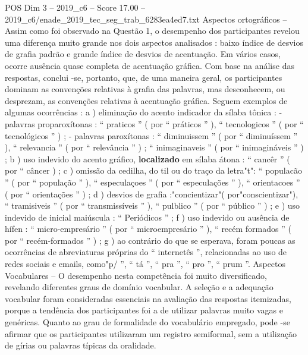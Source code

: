 \begin{textsample}{POS Dim 3 – 2019\_c6 – Score 17.00 – 2019\_c6/enade\_2019\_tec\_seg\_trab\_6283ea4ed7.txt}
Aspectos ortográficos – Assim como foi observado na Questão 1, o desempenho dos participantes revelou uma diferença muito grande nos dois aspectos analisados : baixo índice de desvios de grafia padrão e grande índice de desvios de acentuação.
Em vários casos, ocorre ausência quase completa de acentuação gráfica.
Com base na análise das respostas, conclui -se, portanto, que, de uma maneira geral, os participantes dominam as convenções relativas à grafia das palavras, mas desconhecem, ou desprezam, as convenções relativas à acentuação gráfica.
Seguem exemplos de algumas ocorrências : a ) eliminação do acento indicador da sílaba tônica : - palavras proparoxítonas : “ praticos ” ( por “ práticos ” ), “ tecnologicos ” ( por “ tecnológicos ” ) ; - palavras paroxítonas : “ diminuissem ” ( por “ diminuíssem ” ), “ relevancia ” ( por “ relevância ” ) ; “ inimaginaveis ” ( por “ inimagináveis ” ) ; b ) uso indevido do acento gráfico, \textbf{localizado} em sílaba átona : “ cancêr ” ( por “ câncer ) ; c ) omissão da cedilha, do til ou do traço da letra"t": “ populacão ” ( por “ população ” ), “ especulaçoes ” ( por “ especulações ” ), “ orientacoes ” ( por “ orientações ” ) ; d ) desvios de grafia :"concientizar"( por"conscientizar"), “ tramisiveis ” ( por “ transmissíveis ” ), “ pulblico ” ( por “ público ” ) ; e ) uso indevido de inicial maiúscula : “ Periódicos ” ; f ) uso indevido ou ausência de hífen : “ micro-empresário ” ( por “ microempresário ” ), “ recém formados ” ( por “ recém-formados ” ) ; g ) ao contrário do que se esperava, foram poucas as ocorrências de abreviaturas próprias do “ internetês ”, relacionadas ao uso de redes sociais e emails, como"p/ ”, “ tá ”, “ pra ”, “ pro ”, “ prum ”.
Aspectos Vocabulares – O desempenho nesta competência foi muito diversificado, revelando diferentes graus de domínio vocabular.
A seleção e a adequação vocabular foram consideradas essenciais na avaliação das respostas itemizadas, porque a tendência dos participantes foi a de utilizar palavras muito vagas e genéricas.
Quanto ao grau de formalidade do vocabulário empregado, pode -se afirmar que os participantes utilizaram um registro semiformal, sem a utilização de gírias ou palavras típicas da oralidade.

\end{textsample}
